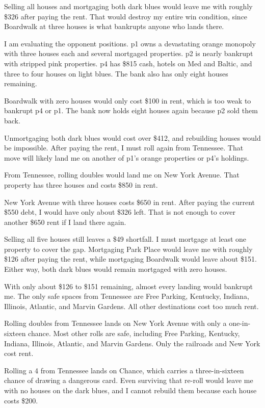 Selling all houses and mortgaging both dark blues would leave me with roughly \$326 after paying the rent. That would destroy my entire win condition, since Boardwalk at three houses is what bankrupts anyone who lands there.

I am evaluating the opponent positions. p1 owns a devastating orange monopoly with three houses each and several mortgaged properties. p2 is nearly bankrupt with stripped pink properties. p4 has \$815 cash, hotels on Med and Baltic, and three to four houses on light blues. The bank also has only eight houses remaining.

Boardwalk with zero houses would only cost \$100 in rent, which is too weak to bankrupt p4 or p1. The bank now holds eight houses again because p2 sold them back.

Unmortgaging both dark blues would cost over \$412, and rebuilding houses would be impossible. After paying the rent, I must roll again from Tennessee. That move will likely land me on another of p1's orange properties or p4's holdings.

From Tennessee, rolling doubles would land me on New York Avenue. That property has three houses and costs \$850 in rent.

New York Avenue with three houses costs \$650 in rent. After paying the current \$550 debt, I would have only about \$326 left. That is not enough to cover another \$650 rent if I land there again.

Selling all five houses still leaves a \$49 shortfall. I must mortgage at least one property to cover the gap. Mortgaging Park Place would leave me with roughly \$126 after paying the rent, while mortgaging Boardwalk would leave about \$151. Either way, both dark blues would remain mortgaged with zero houses.

With only about \$126 to \$151 remaining, almost every landing would bankrupt me. The only safe spaces from Tennessee are Free Parking, Kentucky, Indiana, Illinois, Atlantic, and Marvin Gardens. All other destinations cost too much rent.

Rolling doubles from Tennessee lands on New York Avenue with only a one-in-sixteen chance. Most other rolls are safe, including Free Parking, Kentucky, Indiana, Illinois, Atlantic, and Marvin Gardens. Only the railroads and New York cost rent.

Rolling a 4 from Tennessee lands on Chance, which carries a three-in-sixteen chance of drawing a dangerous card. Even surviving that re-roll would leave me with no houses on the dark blues, and I cannot rebuild them because each house costs \$200.

